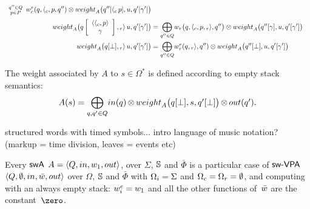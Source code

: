 \begin{align}
{{\begin{array}{c}
                          \scriptstyle q'' \in Q\\[-1ex]
                          \scriptstyle p \in P
                          \end{array}}}
  \weiec(q, {\call{c}}, p, q'') 
  \otimes \weight_A\bigl(\config{q''}{{\call{c}}\, p}, u, 
                         \config{q'}{\gamma'}\bigr)\nonumber\\
%
\weight_A\bigl(\configup{q}{\<{\call{c}}, p>\stackup \gamma}, {\return{r}}\, u, 
               \config{q'}{\gamma'}\bigr) & =  
 {\displaystyle\bigoplus_{q'' \in Q}} 
  \weir\bigl(q, {\call{c}}, p, {\return{r}}, q''\bigr) 
  \otimes \weight_A\bigl(\config{q''}{\gamma}, u, 
                         \config{q'}{\gamma'}\bigr)\nonumber\\
%
\weight_A\bigl(\config{q}{\bot}, {\return{r}}\, u, 
               \config{q'}{\gamma'}\bigr) & =  
 {\displaystyle\bigoplus_{q'' \in Q}} \weier(q, {\return{r}}, q'') 
  \otimes \weight_A\bigl(\config{q''}{\bot}, u, 
                         \config{q'}{\gamma'}\bigr)\nonumber
\end{align}
%

\noindent
The weight associated by $A$ to $s \in \Omega^*$
is defined according to empty stack semantics: 
%
\begin{equation}
A(s)  = 
{\displaystyle\bigoplus_{q, q' \in Q}} \textstyle
\mathsf{in}(q) \mathop{\otimes} 
\weight_A\bigl(\config{q}{\bot}, s, \config{q'}{\bot}\bigr) 
\mathop{\otimes} \mathsf{out}(q').
\label{eq:weightA}
\end{equation}

\begin{example}
structured words with timed symbols...
intro language of music notation? (markup = time division, leaves = events etc)
\end{example}

\noindent 
Every $\textsf{swA}$ $A = \< Q, \init, {\wei_1}, \final >$,
over $\Sigma$, $\mathbb{S}$ and $\bar\Phi$
is a particular case of $\textsf{sw-VPA}$ 
$\< Q, \emptyset, \init, \bar\wei, \final >$ 
over $\Omega$, $\mathbb{S}$ and $\bar\Phi$
with $\Omegai = \Sigma$ and $\Omegac = \Omegar = \emptyset$,
and computing with an always empty stack:
$\weiei = \wei_1$ and all the other functions 
of~$\bar\wei$ are the constant~$\zero$.


